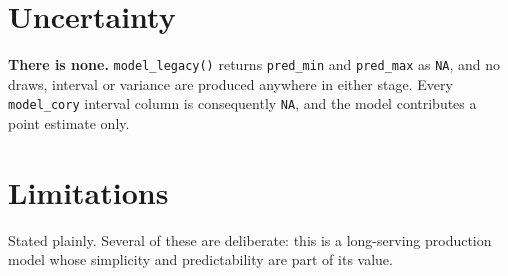 \documentclass[11pt]{article}
\newcommand{\var}[1]{\texttt{#1}}
\begin{document}
\section{Uncertainty}

\textbf{There is none.} \texttt{model\_legacy()} returns \var{pred\_min} and
\var{pred\_max} as \texttt{NA}, and no draws, interval or variance are produced anywhere
in either stage. Every \texttt{model\_cory} interval column is consequently \texttt{NA}, and the model contributes a point estimate only.

\section*{Limitations}

Stated plainly. Several of these are deliberate: this is a long-serving production model
whose simplicity and predictability are part of its value.
\end{document}

